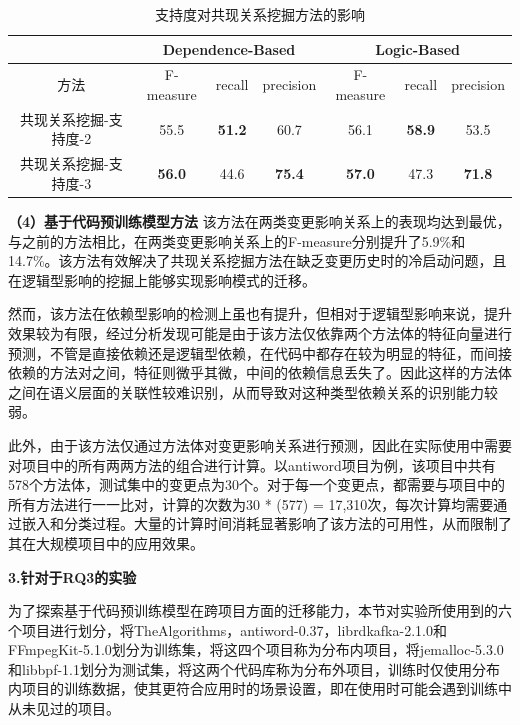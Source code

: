 \begin{table}[htbp]
\caption{支持度对共现关系挖掘方法的影响}
\label{1_支持度对共现关系挖掘方法的影响}
\vspace{0.5em}\centering\wuhao
\begin{tabular}{c|ccc|ccc}
\toprule
  & \multicolumn{3}{c|}{Dependence-Based} & \multicolumn{3}{c}{Logic-Based}  \\
\midrule
方法 & F-measure & recall & precision & F-measure & recall & precision  \\
\midrule
共现关系挖掘-支持度-2 & 55.5 & \textbf{51.2} & 60.7 & 56.1 & \textbf{58.9} & 53.5 \\
共现关系挖掘-支持度-3 & \textbf{56.0} & 44.6 & \textbf{75.4} & \textbf{57.0} & 47.3 & \textbf{71.8} \\
\bottomrule
\end{tabular}
\end{table}

\textbf{（4）基于代码预训练模型方法} \hspace{2mm}该方法在两类变更影响关系上的表现均达到最优，与之前的方法相比，在两类变更影响关系上的F-measure分别提升了5.9\%和14.7\%。该方法有效解决了共现关系挖掘方法在缺乏变更历史时的冷启动问题，且在逻辑型影响的挖掘上能够实现影响模式的迁移。

然而，该方法在依赖型影响的检测上虽也有提升，但相对于逻辑型影响来说，提升效果较为有限，经过分析发现可能是由于该方法仅依靠两个方法体的特征向量进行预测，不管是直接依赖还是逻辑型依赖，在代码中都存在较为明显的特征，而间接依赖的方法对之间，特征则微乎其微，中间的依赖信息丢失了。因此这样的方法体之间在语义层面的关联性较难识别，从而导致对这种类型依赖关系的识别能力较弱。

此外，由于该方法仅通过方法体对变更影响关系进行预测，因此在实际使用中需要对项目中的所有两两方法的组合进行计算。以antiword项目为例，该项目中共有578个方法体，测试集中的变更点为30个。对于每一个变更点，都需要与项目中的所有方法进行一一比对，计算的次数为30 * (577) = 17,310次，每次计算均需要通过嵌入和分类过程。大量的计算时间消耗显著影响了该方法的可用性，从而限制了其在大规模项目中的应用效果。
    

\textbf{3.针对于RQ3的实验}

为了探索基于代码预训练模型在跨项目方面的迁移能力，本节对实验所使用到的六个项目进行划分，将TheAlgorithms，antiword-0.37，librdkafka-2.1.0和FFmpegKit-5.1.0划分为训练集，将这四个项目称为分布内项目，将jemalloc-5.3.0和libbpf-1.1划分为测试集，将这两个代码库称为分布外项目，训练时仅使用分布内项目的训练数据，使其更符合应用时的场景设置，即在使用时可能会遇到训练中从未见过的项目。


